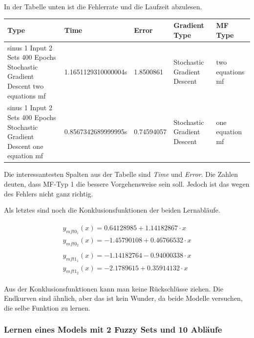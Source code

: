In der Tabelle unten ist die Fehlerrate und die Laufzeit abzulesen.

\begin{center}
	\begin{tabular}{ | p{3cm} | l | l | p{3cm} | p{3cm} |}
		\hline
		Type & Time & Error & Gradient Type & MF Type \\ \hline
		sinus 1 Input 2 Sets 400 Epochs Stochastic Gradient Descent two equations mf&1.1651129310000004s&1.8500861&Stochastic Gradient Descent&two equations mf
		 \\ \hline
		sinus 1 Input 2 Sets 400 Epochs Stochastic Gradient Descent one equation mf&0.8567342689999995s&0.74594057&Stochastic Gradient Descent&one equation mf
		 \\ \hline
	\end{tabular}
\end{center}

Die interessantesten Spalten aus der Tabelle sind \textit{Time} und \textit{Error}. Die Zahlen deuten, dass MF-Typ 1 die bessere Vorgehensweise sein soll. Jedoch ist das wegen des Fehlers nicht ganz richtig.

Als letztes sind noch die Konklusionsfunktionen der beiden Lernabläufe.



\begin{align}
	\begin{split}\label{mf_0:1}
		y_{mft0_1}(x) = 0.64128985 + 1.14182867\cdot x \\
		y_{mft0_2}(x) = -1.45790108 + 0.46766532\cdot x
	\end{split} \\	
	\begin{split}\label{mf_1:1}
	y_{mft1_1}(x) = -1.14182764 - 0.94000338\cdot x \\
	y_{mft1_2}(x) = -2.1789615 + 0.35914132\cdot x
	\end{split}	
\end{align}

Aus der Konklusionsfunktionen kann man keine Rückschlüsse ziehen. Die Endkurven sind ähnlich, aber das ist kein Wunder, da beide Modelle versuchen, die selbe Funktion zu lernen. 

\subsubsection{Lernen eines Models mit 2 Fuzzy Sets und 10 Abläufe}\label{m2fs10ab}

